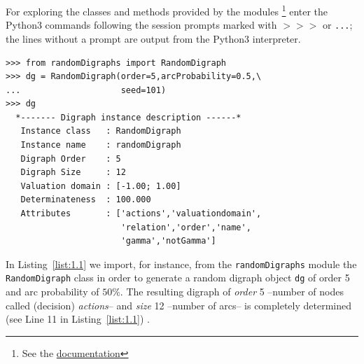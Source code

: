 For exploring the classes and methods provided by the \Digraph modules \footnote{See the \href{https://digraph3.readthedocs.io/en/latest/}{\Digraph documentation}} enter the Python3 commands following the session prompts marked with $>>>$ or \texttt{...}; the lines without a prompt are output from the Python3 interpreter.
\begin{lstlisting}[caption={Generating a digraph instance},label=list:1.1]
>>> from randomDigraphs import RandomDigraph
>>> dg = RandomDigraph(order=5,arcProbability=0.5,\
...                    seed=101)
>>> dg
  *------- Digraph instance description ------*
   Instance class   : RandomDigraph
   Instance name    : randomDigraph
   Digraph Order    : 5
   Digraph Size     : 12
   Valuation domain : [-1.00; 1.00]
   Determinateness  : 100.000
   Attributes       : ['actions','valuationdomain',
                       'relation','order','name',
                       'gamma','notGamma']
\end{lstlisting}
In Listing~\vref{list:1.1}  we import, for instance, from the \texttt{randomDigraphs} module the \texttt{RandomDigraph} class  in order to generate a random digraph object \texttt{dg} of order 5 and arc probability of $50\%$. The resulting digraph of \emph{order} 5 --number of nodes called (decision) \emph{actions}-- and \emph{size} 12 --number of arcs-- is completely determined (see Line 11 in Listing~\vref{list:1.1}) .

